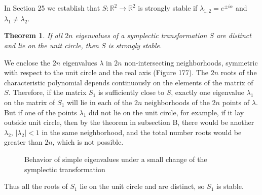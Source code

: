 \documentclass[leqno]{report}
\numberwithin{equation}{section}
\theoremstyle{plain}
\newtheorem*{thm*}{Theorem}
\let\oldendproof\endproof
\renewenvironment{proof}[1][\proofname]{%
  \oldproof[\textsc{#1}]%
}{\oldendproof}
\theoremstyle{definition}
\theoremstyle{remark}
\theoremstyle{smallcap}
\numberwithin{prob}{section}
\begin{document}
In Section 25 we establish that $S: \mathbb R^2 \to \mathbb R^2$
is strongly stable if $\lambda_{1,2} = e^{\pm i\alpha}$
and $\lambda_1 \ne \lambda_2$.

\begin{thm*}
  If all $2n$ eigenvalues of a symplectic transformation $S$ are distinct
  and lie on the unit circle, then $S$ is strongly stable.
\end{thm*}

\begin{proof}
  We enclose the $2n$ eigenvalues $\lambda$ in $2n$ non-intersecting neighborhoods,
  symmetric with respect to the unit circle and the real axis (Figure 177).
  The $2n$ roots of the characteristic polynomial depends continuously on
  the elements of the matrix of $S$.
  Therefore, if the matrix $S_1$ is sufficiently close to $S$,
  exactly one eigenvalue $\lambda_1$ on the matrix of $S_1$
  will lie in each of the $2n$ neighborhoods of the $2n$
  points of $\lambda$.
  But if one of the points $\lambda_1$ did not lie on the unit circle,
  for example, if it lay outside unit circle, then by the theorem in
  subsection B, there would be another $\lambda_2$, $|\lambda_2| < 1$
  in the same neighborhood,
  and the total number roots would be greater than $2n$,
  which is not possible.

  \setcounter{figure}{176}
  \begin{figure}[h]
    \centering
    \caption{
      Behavior of simple eigenvalues under a small change
      of the symplectic transformation
    }
  \end{figure}

  Thus all the roots of $S_1$ lie on the unit circle and are distinct,
  so $S_1$ is stable.
\end{proof}
\end{document}
